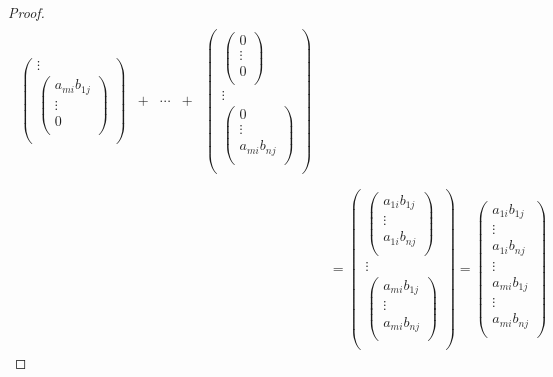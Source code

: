 \documentclass[dvipdfmx]{jsarticle}
\begin{document}
\begin{proof}
\begin{align*}
\begin{matrix}
\begin{pmatrix}
 \vdots \\
\begin{pmatrix}
a_{mi}b_{1j} \\
 \vdots \\
0 \\
\end{pmatrix} \\
\end{pmatrix} & + & \cdots & + & \begin{pmatrix}
\begin{pmatrix}
0 \\
 \vdots \\
0 \\
\end{pmatrix} \\
 \vdots \\
\begin{pmatrix}
0 \\
 \vdots \\
a_{mi}b_{nj} \\
\end{pmatrix} \\
\end{pmatrix} \\
\end{matrix}\\
&= \begin{pmatrix}
\begin{pmatrix}
a_{1i}b_{1j} \\
 \vdots \\
a_{1i}b_{nj} \\
\end{pmatrix} \\
 \vdots \\
\begin{pmatrix}
a_{mi}b_{1j} \\
 \vdots \\
a_{mi}b_{nj} \\
\end{pmatrix} \\
\end{pmatrix} = \begin{pmatrix}
a_{1i}b_{1j} \\
 \vdots \\
a_{1i}b_{nj} \\
 \vdots \\
a_{mi}b_{1j} \\
 \vdots \\
a_{mi}b_{nj} \\
\end{pmatrix}

\end{align*}
\end{proof}
\end{document}
